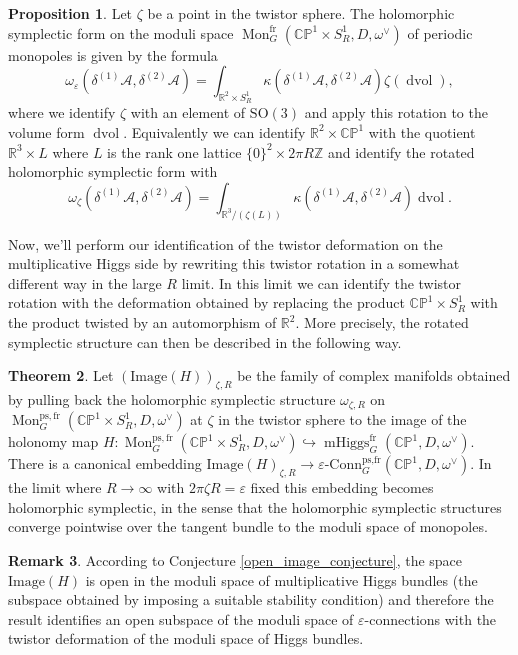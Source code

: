 \documentclass[11pt, oneside, reqno]{amsart}
\theoremstyle{definition} \newtheorem{definition}{Definition}[section]
\newtheorem{theorem}[definition]{Theorem}
\newtheorem{prop}[definition]{Proposition}
\theoremstyle{definition} \newtheorem{remark}[definition]{Remark}
\theoremstyle{definition} \newtheorem{remarks}[definition]{Remarks}
\theoremstyle{definition} \newtheorem{question}[definition]{Question}
\theoremstyle{definition} \newtheorem*{note}{Note}
\theoremstyle{definition} \newtheorem{example}[definition]{Example}
\theoremstyle{definition} \newtheorem{examples}[definition]{Examples}
\newcommand{\bb}[1]{\mathbb{#1}}
\newcommand{\mr}[1]{\mathrm{#1}}
\newcommand{\mc}[1]{\mathcal{#1}}
\newcommand{\inj}{\hookrightarrow}
\newcommand{\RR}{\mathbb{R}}
\newcommand{\ZZ}{\mathbb{Z}}
\newcommand{\eps}{\varepsilon}
\newcommand{\SO}{\mathrm{SO}}
\DeclareMathOperator{\dvol}{dvol}
\DeclareMathOperator{\mhiggs}{mHiggs}
\DeclareMathOperator{\mon}{Mon}
\newcommand{\epsconn}{\varepsilon\text{-Conn}}
\newcommand{\fr}{\mathrm{fr}}
\begin{document}
\begin{prop}
Let $\zeta$ be a point in the twistor sphere.  The holomorphic symplectic form on the moduli space $\mon_G^{\fr}(\bb{CP}^1 \times S^1_R, D, \omega^\vee)$ of periodic monopoles is given by the formula 
\[\omega_\eps(\delta^{(1)}\mc A, \delta^{(2)}\mc A) = \int_{\RR^2 \times S^1_R} \kappa(\delta^{(1)} \mc A, \delta^{(2)} \mc A) \zeta(\dvol),\]
where we identify $\zeta$ with an element of $\SO(3)$ and apply this rotation to the volume form $\dvol$.  Equivalently we can identify $\RR^2 \times \bb{CP}^1$ with the quotient $\RR^3 \times L$ where $L$ is the rank one lattice $\{0\}^2 \times 2\pi R\ZZ$ and identify the rotated holomorphic symplectic form with 
\[\omega_\zeta(\delta^{(1)}\mc A, \delta^{(2)}\mc A) = \int_{\RR^3/(\zeta(L))} \kappa(\delta^{(1)} \mc A, \delta^{(2)} \mc A) \dvol.\]
\end{prop}

Now, we'll perform our identification of the twistor deformation on the multiplicative Higgs side by rewriting this twistor rotation in a somewhat different way in the large $R$ limit.  In this limit we can identify the twistor rotation with the deformation obtained by replacing the product $\bb{CP}^1 \times S^1_R$ with the product twisted by an automorphism of $\RR^2$.  More precisely, the rotated symplectic structure can then be described in the following way.

\begin{theorem} \label{HK_rotation_thm}
Let $\left(\mr{Image}(H)\right)_{\zeta,R}$ be the family of complex manifolds obtained by pulling back the holomorphic symplectic structure $\omega_{\zeta,R}$ on $\mon_G^{\mr{ps},\fr}(\bb{CP}^1 \times S^1_R,D,\omega^\vee)$ at $\zeta$ in the twistor sphere to the image of the holonomy map $H \colon \mon_G^{\mr{ps},\fr}(\bb{CP}^1 \times S^1_R,D,\omega^\vee) \inj \mhiggs^{\text{fr}}_G(\bb{CP}^1,D,\omega^\vee)$.  There is a canonical embedding $\mr{Image}(H)_{\zeta,R} \to \epsconn^{\text{ps,fr}}_G(\bb{CP}^1,D,\omega^\vee)$.  In the limit where $R \to \infty$ with $2 \pi \zeta R = \eps$ fixed this embedding becomes holomorphic symplectic, in the sense that the holomorphic symplectic structures converge pointwise over the tangent bundle to the moduli space of monopoles. 
\end{theorem}

\begin{remark}
According to Conjecture \ref{open_image_conjecture}, the space $\mr{Image}(H)$ is open in the moduli space of multiplicative Higgs bundles (the subspace obtained by imposing a suitable stability condition) and therefore the result identifies an open subspace of the moduli space of $\eps$-connections with the twistor deformation of the moduli space of Higgs bundles. 
\end{remark}
\end{document}

